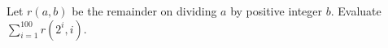 Let $r(a,b)$ be the remainder on dividing $a$ by positive integer $b$. Evaluate $\sum_{i=1}^{100}r(2^i,i)$.
